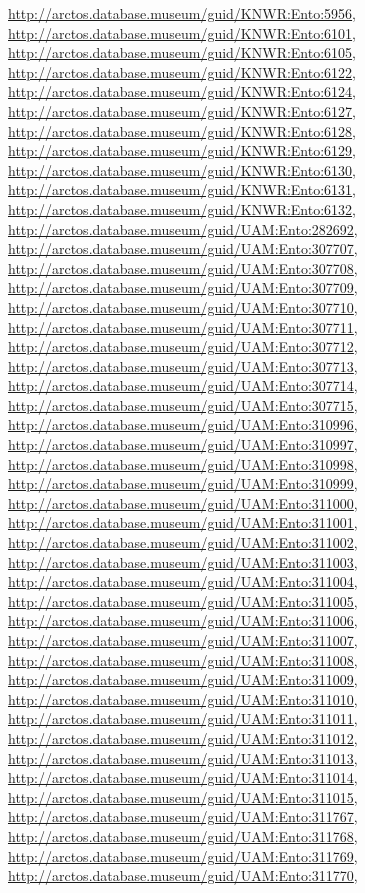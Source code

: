 \documentclass[9pt, article]{memoir}
\begin{document}
\begin{multicols}{2}
\url{http://arctos.database.museum/guid/KNWR:Ento:5956}, 
\url{http://arctos.database.museum/guid/KNWR:Ento:6101}, 
\url{http://arctos.database.museum/guid/KNWR:Ento:6105}, 
\url{http://arctos.database.museum/guid/KNWR:Ento:6122}, 
\url{http://arctos.database.museum/guid/KNWR:Ento:6124}, 
\url{http://arctos.database.museum/guid/KNWR:Ento:6127}, 
\url{http://arctos.database.museum/guid/KNWR:Ento:6128}, 
\url{http://arctos.database.museum/guid/KNWR:Ento:6129}, 
\url{http://arctos.database.museum/guid/KNWR:Ento:6130}, 
\url{http://arctos.database.museum/guid/KNWR:Ento:6131}, 
\url{http://arctos.database.museum/guid/KNWR:Ento:6132}, 
\url{http://arctos.database.museum/guid/UAM:Ento:282692}, 
\url{http://arctos.database.museum/guid/UAM:Ento:307707}, 
\url{http://arctos.database.museum/guid/UAM:Ento:307708}, 
\url{http://arctos.database.museum/guid/UAM:Ento:307709}, 
\url{http://arctos.database.museum/guid/UAM:Ento:307710}, 
\url{http://arctos.database.museum/guid/UAM:Ento:307711}, 
\url{http://arctos.database.museum/guid/UAM:Ento:307712}, 
\url{http://arctos.database.museum/guid/UAM:Ento:307713}, 
\url{http://arctos.database.museum/guid/UAM:Ento:307714}, 
\url{http://arctos.database.museum/guid/UAM:Ento:307715}, 
\url{http://arctos.database.museum/guid/UAM:Ento:310996}, 
\url{http://arctos.database.museum/guid/UAM:Ento:310997}, 
\url{http://arctos.database.museum/guid/UAM:Ento:310998}, 
\url{http://arctos.database.museum/guid/UAM:Ento:310999}, 
\url{http://arctos.database.museum/guid/UAM:Ento:311000}, 
\url{http://arctos.database.museum/guid/UAM:Ento:311001}, 
\url{http://arctos.database.museum/guid/UAM:Ento:311002}, 
\url{http://arctos.database.museum/guid/UAM:Ento:311003}, 
\url{http://arctos.database.museum/guid/UAM:Ento:311004}, 
\url{http://arctos.database.museum/guid/UAM:Ento:311005}, 
\url{http://arctos.database.museum/guid/UAM:Ento:311006}, 
\url{http://arctos.database.museum/guid/UAM:Ento:311007}, 
\url{http://arctos.database.museum/guid/UAM:Ento:311008}, 
\url{http://arctos.database.museum/guid/UAM:Ento:311009}, 
\url{http://arctos.database.museum/guid/UAM:Ento:311010}, 
\url{http://arctos.database.museum/guid/UAM:Ento:311011}, 
\url{http://arctos.database.museum/guid/UAM:Ento:311012}, 
\url{http://arctos.database.museum/guid/UAM:Ento:311013}, 
\url{http://arctos.database.museum/guid/UAM:Ento:311014}, 
\url{http://arctos.database.museum/guid/UAM:Ento:311015}, 
\url{http://arctos.database.museum/guid/UAM:Ento:311767}, 
\url{http://arctos.database.museum/guid/UAM:Ento:311768}, 
\url{http://arctos.database.museum/guid/UAM:Ento:311769}, 
\url{http://arctos.database.museum/guid/UAM:Ento:311770}, 

\end{multicols}
\end{document}
